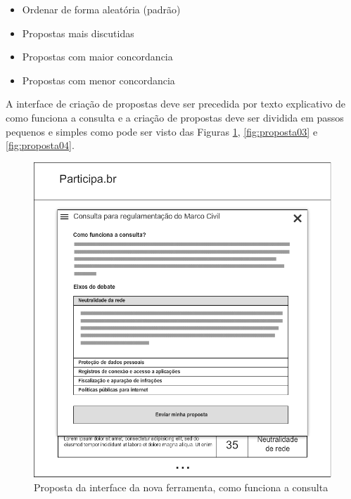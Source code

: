 \documentclass[12pt]{article}
\begin{document}
\begin{itemize}
  \item Ordenar de forma aleatória (padrão)
  \item Propostas mais discutidas
  \item Propostas com maior concordancia
  \item Propostas com menor concordancia
\end{itemize}

A interface de criação de propostas deve ser precedida por texto explicativo
de como funciona a consulta e a criação de propostas deve ser dividida em
passos pequenos e simples como pode ser visto das Figuras
\ref{fig:proposta02}, \ref{fig:proposta03} e \ref{fig:proposta04}.

\begin{figure}[h]
\center
\includegraphics[scale=0.5]{02_-_metodologia_e_eixos.png}
\caption{Proposta da interface da nova ferramenta, como funciona a consulta}
\label{fig:proposta02}
\end{figure}
\end{document}
